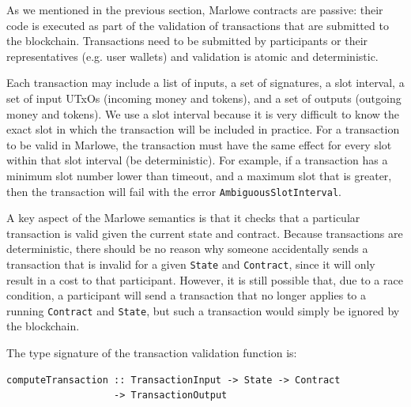 \documentclass[english,runningheads]{llncs}
\begin{document}
As we mentioned in the previous section, Marlowe
contracts are passive: their code is executed as part of the validation of
transactions that are submitted to the blockchain. Transactions
need to be submitted by participants or their representatives (e.g.
user wallets) and validation is atomic and deterministic.

Each transaction may include a list of inputs, a set of signatures,
a slot interval, a set of input UTxOs (incoming money and tokens), and a
set of outputs (outgoing money and tokens). We use a slot interval because
it is very difficult to know the exact slot in which the transaction will
be included in practice. For a transaction to be valid in Marlowe, the
transaction must have the same effect for every slot within that slot
interval (be deterministic). For example, if a transaction has a minimum
slot number lower than timeout, and a maximum slot that is greater, then the transaction will fail with the error \texttt{AmbiguousSlotInterval}.

A key aspect of the Marlowe semantics is that it checks that a particular
transaction is valid given the current state and contract. Because
transactions are deterministic, there should be no reason why someone
accidentally sends a transaction that is invalid for a given \texttt{State}
and \texttt{Contract}, since it will only result in a cost to that participant.
However, it is still possible that, due to a race condition, a participant will send a
transaction that no longer applies to a running \texttt{Contract} and
\texttt{State}, but such a transaction would simply be ignored by the
blockchain.

The type signature of the transaction validation function is:

\begin{verbatim}
computeTransaction :: TransactionInput -> State -> Contract
                   -> TransactionOutput 
\end{verbatim}
\end{document}
